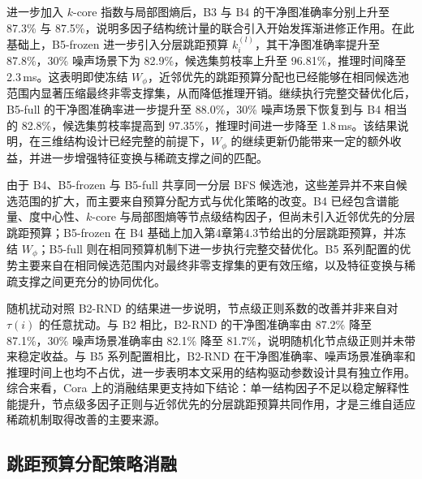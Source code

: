 进一步加入 $k$-core 指数与局部图熵后，B3 与 B4 的干净图准确率分别上升至 87.3\% 与 87.5\%，说明多因子结构统计量的联合引入开始发挥渐进修正作用。在此基础上，B5-frozen 进一步引入分层跳距预算 $k_i^{(l)}$，其干净图准确率提升至 87.8\%，30\% 噪声场景下为 82.9\%，候选集剪枝率上升至 96.81\%，推理时间降至 2.3\,ms。这表明即使冻结 $W_\phi$，近邻优先的跳距预算分配也已经能够在相同候选池范围内显著压缩最终非零支撑集，从而降低推理开销。继续执行完整交替优化后，B5-full 的干净图准确率进一步提升至 88.0\%，30\% 噪声场景下恢复到与 B4 相当的 82.8\%，候选集剪枝率提高到 97.35\%，推理时间进一步降至 1.8\,ms。该结果说明，在三维结构设计已经完整的前提下，$W_\phi$ 的继续更新仍能带来一定的额外收益，并进一步增强特征变换与稀疏支撑之间的匹配。

由于 B4、B5-frozen 与 B5-full 共享同一分层 BFS 候选池，这些差异并不来自候选范围的扩大，而主要来自预算分配方式与优化策略的改变。B4 已经包含谱能量、度中心性、$k$-core 与局部图熵等节点级结构因子，但尚未引入近邻优先的分层跳距预算；B5-frozen 在 B4 基础上加入第4章第4.3节给出的分层跳距预算，并冻结 $W_\phi$；B5-full 则在相同预算机制下进一步执行完整交替优化。B5 系列配置的优势主要来自在相同候选范围内对最终非零支撑集的更有效压缩，以及特征变换与稀疏支撑之间更充分的协同优化。

随机扰动对照 B2-RND 的结果进一步说明，节点级正则系数的改善并非来自对 $\tau(i)$ 的任意扰动。与 B2 相比，B2-RND 的干净图准确率由 87.2\% 降至 87.1\%，30\% 噪声场景准确率由 82.1\% 降至 81.7\%，说明随机化节点级正则并未带来稳定收益。与 B5 系列配置相比，B2-RND 在干净图准确率、噪声场景准确率和推理时间上也均不占优，进一步表明本文采用的结构驱动参数设计具有独立作用。综合来看，Cora 上的消融结果更支持如下结论：单一结构因子不足以稳定解释性能提升，节点级多因子正则与近邻优先的分层跳距预算共同作用，才是三维自适应稀疏机制取得改善的主要来源。

\subsection{跳距预算分配策略消融}
\label{subsec:ch6-hopbudget}

